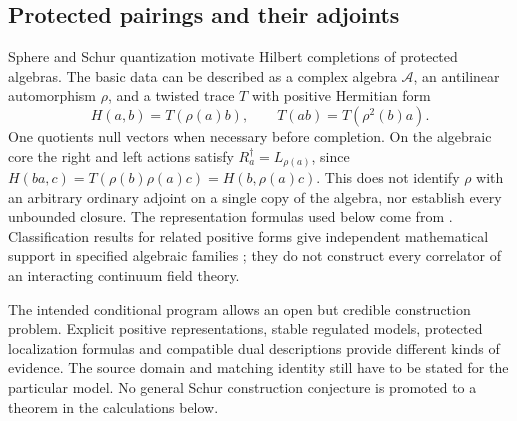 \subsection{Protected pairings and their adjoints}
Sphere and Schur quantization motivate Hilbert completions of protected
algebras. The basic data can be described as a complex algebra
$\mathcal A$, an antilinear automorphism $\rho$, and a twisted trace $T$
with positive Hermitian form
\begin{equation}\label{eq:twisted}
 H(a,b)=T(\rho(a)b),\qquad
 T(ab)=T(\rho^2(b)a).
\end{equation}
One quotients null vectors when necessary before completion. On the
algebraic core the right and left actions satisfy
$R_a^\dagger=L_{\rho(a)}$, since
$H(ba,c)=T(\rho(b)\rho(a)c)=H(b,\rho(a)c)$.
This does not identify $\rho$ with an arbitrary ordinary adjoint on a
single copy of the algebra, nor establish every unbounded closure.
The representation formulas used below come from
\cite{Sphere,Schur,RG}. Classification results for related positive
forms give independent mathematical support in specified algebraic
families \cite{EKRS,Klyuev}; they do not construct every correlator of
an interacting continuum field theory.

The intended conditional program allows an open but credible construction
problem. Explicit positive representations, stable regulated models,
protected localization formulas and compatible dual descriptions provide
different kinds of evidence. The source domain and matching identity
still have to be stated for the particular model. No general Schur
construction conjecture is promoted to a theorem in the calculations below.

